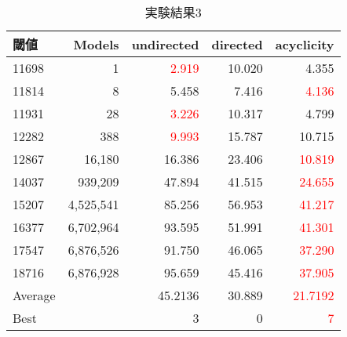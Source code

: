 \begin{table}[htbp]
  \caption{実験結果3}
  \label{cost_table}
  \centering
  \begin{tabular}{|l|r|rrr|}
    \hline
    閾値    &	Models & undirected & directed & acyclicity \\
    \hline
    11698   &	1      &\textcolor{red}{2.919} &10.020 & 4.355	\\
    11814   &	8      &5.458  &7.416	& \textcolor{red}{4.136}	\\
    11931   &	28     &\textcolor{red}{3.226}&10.317	& 4.799	\\
    12282   &	388    &\textcolor{red}{9.993}&15.787	& 10.715	\\
    12867   &	16,180  &16.386       &23.406	& \textcolor{red}{10.819}\\
    14037   &	939,209 &47.894       &41.515	& \textcolor{red}{24.655}\\
    15207   &	4,525,541&85.256       &56.953	& \textcolor{red}{41.217}\\
    16377   &	6,702,964&93.595       &51.991	& \textcolor{red}{41.301}	\\
    17547   &	6,876,526&91.750       &46.065	& \textcolor{red}{37.290}	\\
    18716   &	6,876,928&95.659       &45.416	& \textcolor{red}{37.905}	\\
    \hline
    Average &   & 45.2136 & 30.889  & \textcolor{red}{21.7192}\\
    Best    &   & 3 & 0 & \textcolor{red}{7} \\
    \hline
  \end{tabular}
\end{table}
